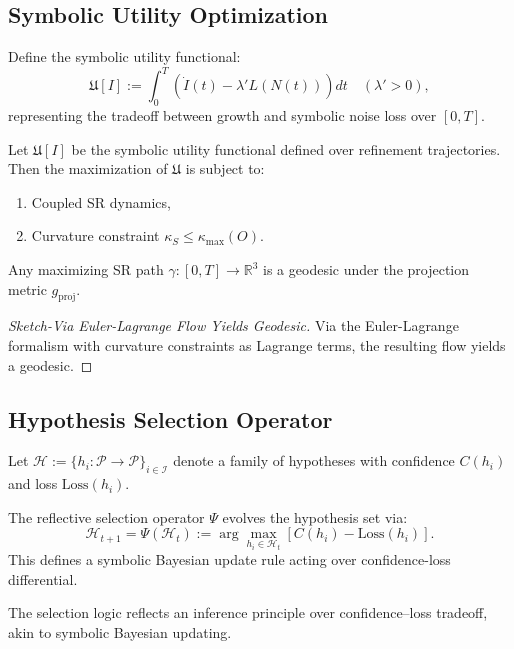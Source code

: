 \subsection*{Symbolic Utility Optimization}
\label{subsec:bk8_symbolic_utility_optimization}
\begin{definition}
\label{definition:bk8_refinement_objective}
Define the symbolic utility functional:
\[
\mathfrak{U}[I] := \int_0^T \left( \dot{I}(t) - \lambda' L(N(t)) \right) dt \quad (\lambda' > 0),
\]
representing the tradeoff between growth and symbolic noise loss over \( [0, T] \).
\end{definition}
\begin{proposition}
\label{prop:bk8_optimal_projection_path}
Let \( \mathfrak{U}[I] \) be the symbolic utility functional defined over refinement trajectories. Then the maximization of \( \mathfrak{U} \) is subject to:
\begin{enumerate}
  \item Coupled SR dynamics,
  \item Curvature constraint \( \kappa_S \leq \kappa_{\max}(O) \).
\end{enumerate}
\end{proposition}
\begin{corollary}
\label{corollary:bk8_sr_path_maximization}
Any maximizing SR path \( \gamma: [0,T] \to \mathbb{R}^3 \) is a geodesic under the projection metric \( g_{\mathrm{proj}} \).
\end{corollary}
\begin{proof}[Sketch-Via Euler-Lagrange Flow Yields Geodesic]
\label{proof:bk8_skech_via_euler_lagrange_flow_yields_geodesic}
Via the Euler-Lagrange formalism with curvature constraints as Lagrange terms, the resulting flow yields a geodesic.
\end{proof}
\subsection*{Hypothesis Selection Operator}
\label{sec:bk8_hypothesis_selection_operator}
\begin{definition}
\label{definition:bk8_symbolic_hypothesis_set}
Let \( \mathcal{H} := \{ h_i : \mathcal{P} \to \mathcal{P} \}_{i \in \mathcal{I}} \) denote a family of hypotheses with confidence \( C(h_i) \) and loss \( \mathrm{Loss}(h_i) \).
\end{definition}
\begin{definition}
\label{definition:bk8_reflective_selection_operator}
The reflective selection operator \( \Psi \) evolves the hypothesis set via:
\[
\mathcal{H}_{t+1} = \Psi(\mathcal{H}_t) := \arg\max_{h_i \in \mathcal{H}_t} \left[ C(h_i) - \mathrm{Loss}(h_i) \right].
\]
This defines a symbolic Bayesian update rule acting over confidence-loss differential.
\end{definition}
\begin{remark}
\label{remark:bk8_inference_principle_over_confidence_loss_tradeoff}
The selection logic reflects an inference principle over confidence–loss tradeoff, akin to symbolic Bayesian updating.
\end{remark}
